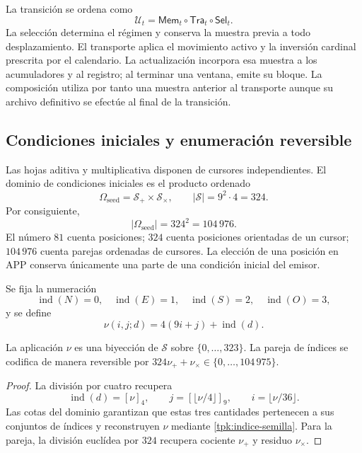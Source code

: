La transición se ordena como
\begin{equation}
 \mathcal U_t=\mathsf{Mem}_t\circ\mathsf{Tra}_t\circ\mathsf{Sel}_t.
 \label{tpk:composicion}
\end{equation}
La selección determina el régimen y conserva la muestra previa a todo
desplazamiento. El transporte aplica el movimiento activo y la inversión
cardinal prescrita por el calendario. La actualización incorpora esa muestra
a los acumuladores y al registro; al terminar una ventana, emite su bloque.
La composición utiliza por tanto una muestra anterior al transporte aunque
su archivo definitivo se efectúe al final de la transición.

\subsection{Condiciones iniciales y enumeración reversible}
\label{tpk:semillas}

Las hojas aditiva y multiplicativa disponen de cursores independientes. El
dominio de condiciones iniciales es el producto ordenado
\[
 \Omega_{\mathrm{seed}}=\mathcal S_+\times\mathcal S_\times,
 \qquad |\mathcal S|=9^2\cdot4=324.
\]
Por consiguiente,
\begin{equation}
 |\Omega_{\mathrm{seed}}|=324^2=104\,976.
 \label{tpk:censo-inicial}
\end{equation}
El número \(81\) cuenta posiciones; \(324\) cuenta posiciones orientadas
de un cursor; \(104\,976\) cuenta parejas ordenadas de cursores. La elección
de una posición en APP conserva únicamente una parte de una condición
inicial del emisor.

Se fija la numeración
\[
 \operatorname{ind}(N)=0,\quad\operatorname{ind}(E)=1,\quad
 \operatorname{ind}(S)=2,\quad\operatorname{ind}(O)=3,
\]
y se define
\begin{equation}
 \nu(i,j;d)=4(9i+j)+\operatorname{ind}(d).
 \label{tpk:indice-semilla}
\end{equation}

\begin{proposicion}
\label{tpk:enumeracion}
La aplicación \(\nu\) es una biyección de \(\mathcal S\) sobre
\(\{0,\ldots,323\}\). La pareja de índices se codifica de manera reversible
por \(324\nu_++\nu_\times\in\{0,\ldots,104\,975\}\).
\end{proposicion}
\begin{proof}
La división por cuatro recupera
\[
 \operatorname{ind}(d)=[\nu]_4,\qquad
 j=[\lfloor\nu/4\rfloor]_9,\qquad i=\lfloor\nu/36\rfloor.
\]
Las cotas del dominio garantizan que estas tres cantidades pertenecen a
sus conjuntos de índices y reconstruyen \(\nu\) mediante
\eqref{tpk:indice-semilla}. Para la pareja, la división euclídea por
\(324\) recupera cociente \(\nu_+\) y residuo \(\nu_\times\).
\end{proof}


